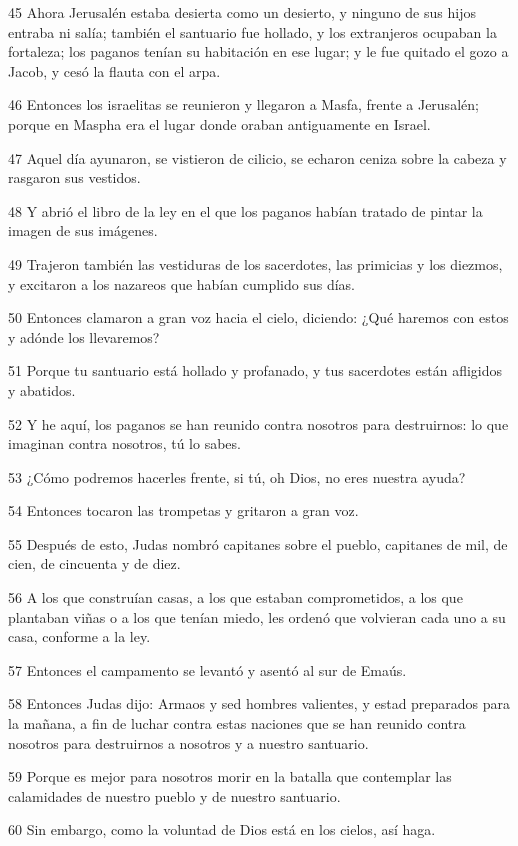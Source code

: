 \par 45 Ahora Jerusalén estaba desierta como un desierto, y ninguno de sus hijos entraba ni salía; también el santuario fue hollado, y los extranjeros ocupaban la fortaleza; los paganos tenían su habitación en ese lugar; y le fue quitado el gozo a Jacob, y cesó la flauta con el arpa.
\par 46 Entonces los israelitas se reunieron y llegaron a Masfa, frente a Jerusalén; porque en Maspha era el lugar donde oraban antiguamente en Israel.
\par 47 Aquel día ayunaron, se vistieron de cilicio, se echaron ceniza sobre la cabeza y rasgaron sus vestidos.
\par 48 Y abrió el libro de la ley en el que los paganos habían tratado de pintar la imagen de sus imágenes.
\par 49 Trajeron también las vestiduras de los sacerdotes, las primicias y los diezmos, y excitaron a los nazareos que habían cumplido sus días.
\par 50 Entonces clamaron a gran voz hacia el cielo, diciendo: ¿Qué haremos con estos y adónde los llevaremos?
\par 51 Porque tu santuario está hollado y profanado, y tus sacerdotes están afligidos y abatidos.
\par 52 Y he aquí, los paganos se han reunido contra nosotros para destruirnos: lo que imaginan contra nosotros, tú lo sabes.
\par 53 ¿Cómo podremos hacerles frente, si tú, oh Dios, no eres nuestra ayuda?
\par 54 Entonces tocaron las trompetas y gritaron a gran voz.
\par 55 Después de esto, Judas nombró capitanes sobre el pueblo, capitanes de mil, de cien, de cincuenta y de diez.
\par 56 A los que construían casas, a los que estaban comprometidos, a los que plantaban viñas o a los que tenían miedo, les ordenó que volvieran cada uno a su casa, conforme a la ley.
\par 57 Entonces el campamento se levantó y asentó al sur de Emaús.
\par 58 Entonces Judas dijo: Armaos y sed hombres valientes, y estad preparados para la mañana, a fin de luchar contra estas naciones que se han reunido contra nosotros para destruirnos a nosotros y a nuestro santuario.
\par 59 Porque es mejor para nosotros morir en la batalla que contemplar las calamidades de nuestro pueblo y de nuestro santuario.
\par 60 Sin embargo, como la voluntad de Dios está en los cielos, así haga.

